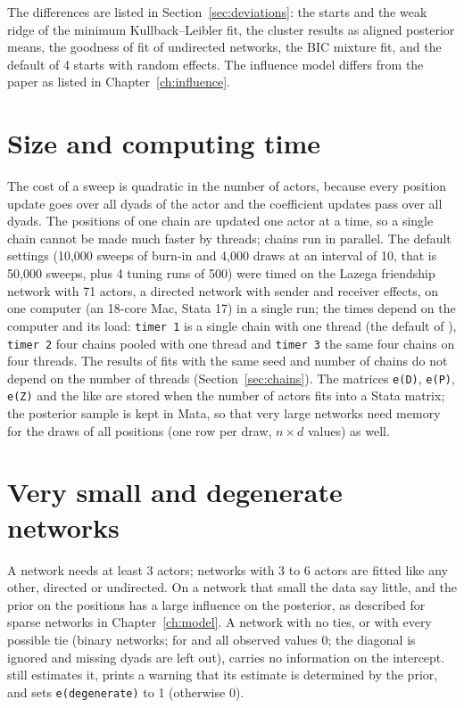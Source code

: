 The differences are listed in Section~\ref{sec:deviations}: the starts and the weak ridge of the minimum Kullback--Leibler fit, the cluster results as aligned posterior means, the goodness of fit of undirected networks, the BIC mixture fit, and the default of 4 starts with random effects. The influence model differs from the paper as listed in Chapter~\ref{ch:influence}.

\section{Size and computing time}

The cost of a sweep is quadratic in the number of actors, because every position update goes over all dyads of the actor and the coefficient updates pass over all dyads. The positions of one chain are updated one actor at a time, so a single chain cannot be made much faster by threads; chains run in parallel. The default settings (10,000 sweeps of burn-in and 4,000 draws at an interval of 10, that is 50,000 sweeps, plus 4 tuning runs of 500) were timed on the Lazega friendship network with 71 actors, a directed network with sender and receiver effects, on one computer (an 18-core Mac, Stata 17) in a single run; the times depend on the computer and its load:
\texttt{timer 1} is a single chain with one thread (the default of ), \texttt{timer 2} four chains pooled with one thread and \texttt{timer 3} the same four chains on four threads. The results of fits with the same seed and number of chains do not depend on the number of threads (Section~\ref{sec:chains}). The matrices \texttt{e(D)}, \texttt{e(P)}, \texttt{e(Z)} and the like are stored when the number of actors fits into a Stata matrix; the posterior sample is kept in Mata, so that very large networks need memory for the draws of all positions (one row per draw, $n\times d$ values) as well.

\section{Very small and degenerate networks}

A network needs at least 3 actors; networks with 3 to 6 actors are fitted like any other, directed or undirected. On a network that small the data say little, and the prior on the positions has a large influence on the posterior, as described for sparse networks in Chapter~\ref{ch:model}. A network with no ties, or with every possible tie (binary networks; for  and  all observed values 0; the diagonal is ignored and missing dyads are left out), carries no information on the intercept. \nwlsm{} still estimates it, prints a warning that its estimate is determined by the prior, and sets \texttt{e(degenerate)} to 1 (otherwise 0).


